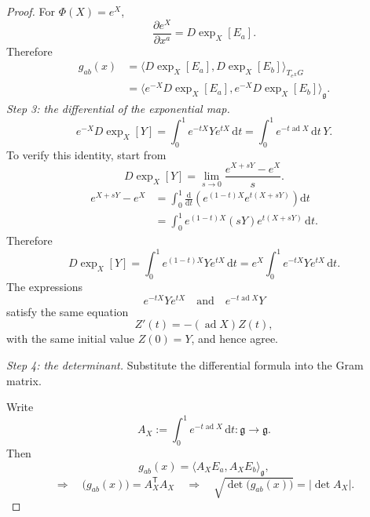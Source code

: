 \documentclass[10pt,reqno]{amsart}
\theoremstyle{definition}
\theoremstyle{remark}
\numberwithin{equation}{section}
\numberwithin{figure}{section}
\newcommand{\g}{\mathfrak g}
\newcommand{\dd}{\mathrm d}
\DeclareMathOperator{\ad}{ad}
\begin{document}
\begin{proof}
For $\Phi(X)=e^X$,
\begin{equation}\label{eq:display-109}
\frac{\partial e^X}{\partial x^a}=D\exp_X[E_a].
\end{equation}
Therefore
\begin{equation}\label{eq:display-110}
\begin{aligned}
g_{ab}(x)
&=\bigl\langle D\exp_X[E_a],D\exp_X[E_b]\bigr\rangle_{T_{e^X}G}\\
&=\bigl\langle e^{-X}D\exp_X[E_a],e^{-X}D\exp_X[E_b]\bigr\rangle_\g.
\end{aligned}
\end{equation}
\smallskip\noindent\emph{Step 3: the differential of the exponential map.}
\begin{equation}\label{eq:display-111}
e^{-X}D\exp_X[Y]
=\int_0^1e^{-tX}Ye^{tX}\,\dd t
=\int_0^1e^{-t\ad X}\,\dd t\,Y.
\end{equation}
To verify this identity, start from
\begin{equation}\label{eq:display-112}
D\exp_X[Y]=\lim_{s\to0}\frac{e^{X+sY}-e^X}{s}.
\end{equation}
\begin{equation}\label{eq:display-113}
\begin{aligned}
e^{X+sY}-e^X
&=\int_0^1\frac{\dd}{\dd t}\left(e^{(1-t)X}e^{t(X+sY)}\right)\dd t\\
&=\int_0^1e^{(1-t)X}(sY)e^{t(X+sY)}\,\dd t.
\end{aligned}
\end{equation}
Therefore
\begin{equation}\label{eq:display-114}
D\exp_X[Y]
=\int_0^1e^{(1-t)X}Ye^{tX}\,\dd t =e^X\int_0^1e^{-tX}Ye^{tX}\,\dd t.
\end{equation}
The expressions
\begin{equation}\label{eq:display-115}
e^{-tX}Ye^{tX}\quad\text{and}\quad e^{-t\ad X}Y
\end{equation}
satisfy the same equation
\begin{equation}\label{eq:display-116}
Z'(t)=-(\ad X)Z(t),
\end{equation}
with the same initial value $Z(0)=Y$, and hence agree.

\smallskip\noindent\emph{Step 4: the determinant.} Substitute the differential formula into the Gram matrix.

Write
\begin{equation}\label{eq:display-117}
A_X:=\int_0^1e^{-t\ad X}\,\dd t:\g\longrightarrow\g.
\end{equation}
Then
\begin{equation}\label{eq:display-118}
g_{ab}(x)=\langle A_XE_a,A_XE_b\rangle_\g,
\end{equation}
\begin{equation}\label{eq:display-119}
\Longrightarrow\quad\bigl(g_{ab}(x)\bigr)=A_X^{\mathsf T}A_X
\quad
\Longrightarrow\quad\sqrt{\det\bigl(g_{ab}(x)\bigr)}=|\det A_X|.
\end{equation}
\end{proof}
\end{document}
